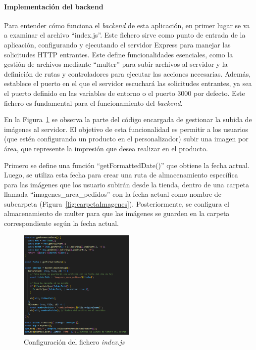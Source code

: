 \documentclass[11pt]{article}
\newcommand{\subsubsubsection}[1]{\paragraph{#1}}
\begin{document}
\subsubsubsection{Implementación del backend}

Para entender cómo funciona el \textit{backend} de esta aplicación, en primer lugar se va a examinar el archivo ``index.js''. Este fichero sirve como 
punto de entrada de la aplicación, configurando y ejecutando el servidor Express para manejar las solicitudes HTTP entrantes. Este define funcionalidades
esenciales, como la gestión de archivos mediante ``multer'' para subir archivos al servidor y la definición de rutas y controladores para ejecutar
las acciones necesarias. Además, establece el puerto en el que el servidor escuchará las solicitudes entrantes, ya sea el puerto definido en las 
variables de entorno o el puerto 3000 por defecto. Este fichero es fundamental para el funcionamiento del \textit{backend}.

En la Figura~\ref{fig:configIndex} se observa la parte del código encargada de gestionar la subida de imágenes al servidor. El objetivo de esta 
funcionalidad es permitir a los usuarios (que estén configurando un producto en el personalizador) subir una imagen por área, que represente la impresión que desea
realizar en el producto. 

Primero se define una función ``getFormattedDate()'' que obtiene la fecha actual. Luego, se utiliza esta fecha para crear una ruta de almacenamiento específica para 
las imágenes que los usuario subirán desde la tienda, dentro de una carpeta llamada ``imagenes\_area\_pedidos'' con la fecha actual como nombre de subcarpeta (Figura~\ref{fig:carpetaImagenes}).
Posteriormente, se configura el almacenamiento de multer para que las imágenes se guarden en la carpeta correspondiente según la fecha actual.

\begin{figure}[H]
    \centering
    \includegraphics[width=0.5\textwidth]{imagenes-back/configuracionIndexjs.png}
    \caption{\label{fig:configIndex} Configuración del fichero \textit{index.js} }
    \vspace{\fill}
\end{figure}
\end{document}
